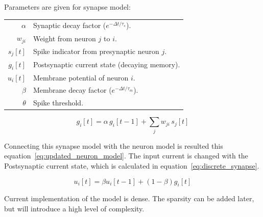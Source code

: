 \documentclass[conference]{IEEEtran}
\begin{document}
Parameters are given for synapse model: \\[0.5em]
\begin{tabular}{r l}
  $\alpha$ & Synaptic decay factor ($e^{-\Delta t / \tau_s}$). \\[0.5em]
  $w_{ji}$ & Weight from neuron $j$ to $i$. \\[0.5em]
  $s_j[t]$ & Spike indicator from presynaptic neuron $j$. \\[0.5em]
  $g_i[t]$ & Postsynaptic current state (decaying memory). \\[0.5em]
  $u_i[t]$ & Membrane potential of neuron $i$. \\[0.5em]
  $\beta$ & Membrane decay factor ($e^{-\Delta t / \tau_m}$). \\[0.5em]
  $\theta$ & Spike threshold.
\end{tabular}


\begin{equation}
g_i[t] = \alpha\, g_i[t-1] + \sum_j w_{ji}\, s_j[t]
\label{eq:discrete_synapse}
\end{equation}

Connecting this synapse model with the neuron model is 
resulted this equation~\ref{eq:updated_neuron_model}.
The input current is changed with the Postsynaptic current state, 
which is calculated in equation~\ref{eq:discrete_synapse}.

\begin{equation}
u_i[t] = \beta u_i[t-1] + (1 - \beta) g_i[t] 
\label{eq:updated_neuron_model}
\end{equation}

Current implementation of the model is dense. 
The sparsity can be added later, but will introduce a high level of complexity.





\end{document}

